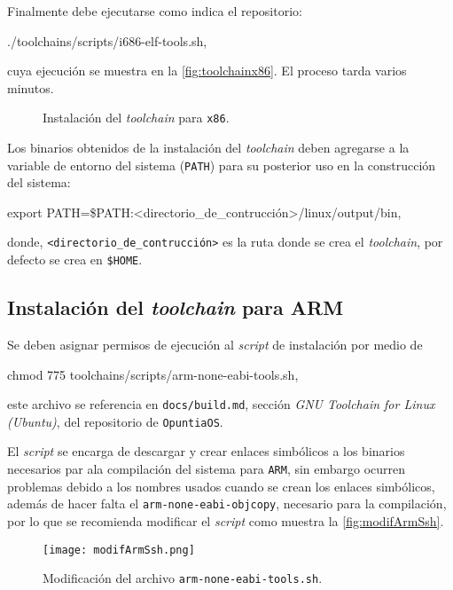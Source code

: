 	\newpage
	
	Finalmente debe ejecutarse como indica el repositorio:
	\begin{center}
		\ttfamily
		./toolchains/scripts/i686-elf-tools.sh,
	\end{center}
	cuya ejecución se muestra en la \autoref{fig:toolchainx86}. El proceso tarda varios minutos.
	\begin{figure}[ht]
		\centering
		\vspace{0.5cm}
		\caption{
			Instalación del \textit{toolchain} para \texttt{x86}.
			\label{fig:toolchainx86}
		}
	\end{figure}

	
	
	Los binarios obtenidos de la instalación del \textit{toolchain} deben 
	agregarse a la variable de entorno del sistema (\texttt{PATH}) para
	su posterior uso en la construcción del sistema:
	\begin{center}
		\ttfamily
		export PATH=\$PATH:<directorio\_de\_contrucción>/linux/output/bin,
	\end{center}

	donde, \texttt{<directorio\_de\_contrucción>} es la ruta donde se 
	crea el \textit{toolchain}, por defecto se crea en \texttt{\$HOME}.
	
	
	
\newpage
\subsection{Instalación del \textit{toolchain} para ARM}
	Se deben asignar permisos de ejecución al \textit{script} de instalación por medio de 
	\begin{center}
		\ttfamily
		chmod 775 toolchains/scripts/arm-none-eabi-tools.sh,
	\end{center}

	este archivo se referencia en \texttt{docs/build.md}, sección \textit{GNU Toolchain for Linux (Ubuntu)}, del repositorio de \texttt{OpuntiaOS}.
	
	
	
	El \textit{script} se encarga de descargar y crear enlaces simbólicos a los binarios necesarios par ala compilación del sistema para \texttt{ARM}, sin embargo ocurren problemas debido a los nombres usados cuando se crean los enlaces simbólicos, además de hacer falta el \texttt{arm-none-eabi-objcopy}, necesario para la compilación, por lo que se recomienda modificar el \textit{script} como muestra la \autoref{fig:modifArmSsh}.
	\begin{figure}[ht]
		\centering
		\texttt{[image: modifArmSsh.png]}
		\caption{
			Modificación del archivo \texttt{arm-none-eabi-tools.sh}.
			\label{fig:modifArmSsh}
		}
	\end{figure}
	

